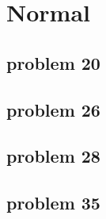 \section{Normal}

\subsection{problem 20}

\subsection{problem 26}

\subsection{problem 28}

\subsection{problem 35}

